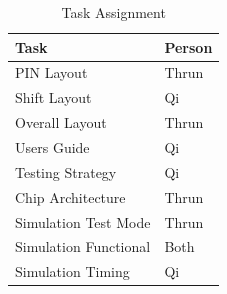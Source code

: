         \begin{table}[H]
            \centering
            \begin{tabular}{ll}
                \toprule
                \textbf{Task} & \textbf{Person}\\
                \midrule
                PIN Layout            & Thrun \\
                Shift Layout          & Qi \\
                Overall Layout        & Thrun \\
                Users Guide           & Qi \\
                Testing Strategy      & Qi \\
                Chip Architecture     & Thrun \\
                Simulation Test Mode  & Thrun \\
                Simulation Functional & Both \\
                Simulation Timing     & Qi \\
                \bottomrule
            \end{tabular}
            \caption{Task Assignment}
        \end{table}

